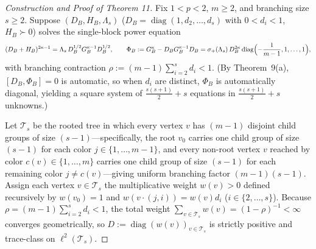 \documentclass[10pt,letterpaper]{article}
\newcommand{\diag}{\operatorname{diag}}
\begin{document}
\begin{proof}[Construction and Proof of Theorem 11]
Fix $1 < p < 2$, $m \ge 2$, and branching size $s \ge 2$. Suppose $(D_B, H_B, \Lambda_s)$ ($D_B = \diag(1, d_2, \dots, d_s)$ with $0 < d_i < 1$, $H_B \succ 0$) solves the single-block power equation
\[
  (D_B + H_B)^{2\kappa - 1} = \Lambda_s\, D_B^{1/2} G_B^{\kappa-1} D_B^{1/2},
  \qquad \Phi_B := G_B^\kappa - D_B G_B^{\kappa-1} D_B = \sigma_+(\Lambda_s)\,D_B^{2\kappa}\diag\Bigl(-\frac{1}{m-1}, 1, \dots, 1\Bigr),
\]
with branching contraction $\rho := (m - 1)\sum_{i=2}^s d_i < 1$. (By Theorem~9(a), $[D_B, \Phi_B] = 0$ is automatic, so when $d_i$ are distinct, $\Phi_B$ is automatically diagonal, yielding a square system of $\frac{s(s+1)}{2} + s$ equations in $\frac{s(s+1)}{2} + s$ unknowns.)

Let $\mathcal{T}_s$ be the rooted tree in which every vertex $v$ has $(m - 1)$ disjoint child groups of size $(s - 1)$—specifically, the root $v_0$ carries one child group of size $(s - 1)$ for each color $j \in \{1,\dots,m-1\}$, and every non-root vertex $v$ reached by color $c(v) \in \{1,\dots,m\}$ carries one child group of size $(s - 1)$ for each remaining color $j \neq c(v)$—giving uniform branching factor $(m - 1)(s - 1)$. Assign each vertex $v \in \mathcal{T}_s$ the multiplicative weight $w(v) > 0$ defined recursively by $w(v_0) = 1$ and $w(v \cdot (j, i)) = w(v) d_i$ ($i \in \{2,\dots,s\}$). Because $\rho = (m-1)\sum_{i=2}^s d_i < 1$, the total weight $\sum_{v \in \mathcal{T}_s} w(v) = (1 - \rho)^{-1} < \infty$ converges geometrically, so $D := \diag(w(v))_{v \in \mathcal{T}_s}$ is strictly positive and trace-class on $\ell^2(\mathcal{T}_s)$.


\end{proof}
\end{document}
